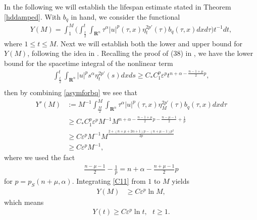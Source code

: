 \documentclass[review]{elsarticle}
\newcommand{\e}{\varepsilon}
\newcommand{\R}{\mathbf{R}}
\begin{document}
In the following we will establish the lifespan estimate stated in Theorem \ref{hddamped}. With $b_q$ in hand, we consider the functional
\begin{equation}\label{C10}
\begin{aligned}
Y(M)=\int_{1}^{M}\bigg(\int_{\frac{t}{2}}^{t}\int_{\R^n}\tau ^{\alpha}|u|^p(\tau,x)\eta_t^{2p'}(\tau)b_q(\tau,x)dxd\tau \bigg)t^{-1}dt,
\end{aligned}
\end{equation}
where $1\le t\le M$. Next we will establish both the lower and upper bound for $Y(M)$, following the idea in \cite{Ike2, Ike3}. Recalling the proof of (38) in \cite{FLT}, we have the lower bound for the spacetime integral of the nonlinear term
\begin{equation}\label{S9}
\begin{aligned}
\int_{\frac t2}^t\int_{\R^n}|u|^ps^{\alpha}\eta_t^{2p'}(s)dxds \geq C_*C_1^p \e^pt^{n+\alpha-\frac{n-1+\mu}{2}p},
\\
\end{aligned}
\end{equation}
then by combining \eqref{asymforbq} we see that
\begin{equation}\label{C11}
\begin{aligned}
Y'(M)&:= M^{-1}\int^{M}_{\frac{M}{2}}\int_{\R^n}\tau ^{\alpha}|u|^p(\tau,x)\eta_M^{2p'}(\tau)b_q(\tau,x)dxd\tau\\
&\geq C_*C_1^p\e^p  M^{-1}M^{n+\alpha-\frac{n-1+\mu}{2}p-\frac{n-\mu-1}{2}+\frac{1}{p}} \\
&\geq C  \e^pM^{-1}M^{\frac{2+(n+\mu+2\alpha+1)p-(n+\mu-1) p^2}{2p}}\\
&\geq C \e^pM^{-1},
\end{aligned}
\end{equation}
where we used the fact
\begin{equation}\label{C12}
\begin{aligned}
\frac{n-\mu-1}{2}-\frac{1}{p}=n+\alpha-\frac{n+\mu-1}{2}p
\end{aligned}
\end{equation}
for $p=p_S(n+\mu,\alpha)$. Integrating \eqref{C11} from $1$ to $M$ yields
\begin{equation}\label{C13}
\begin{aligned}
Y(M)&\geq C \e^p \ln M,
\end{aligned}
\end{equation}
which means
\begin{equation}\label{C14}
\begin{aligned}
Y(t)\geq C \e^p \ln t,~~~ t\geq 1.
\end{aligned}
\end{equation}
\end{document}
